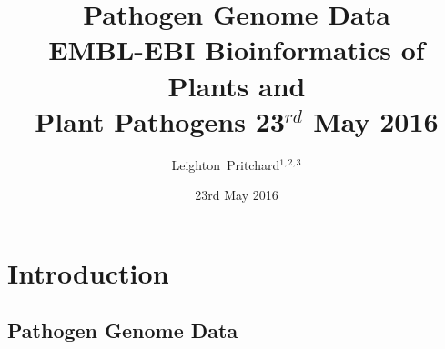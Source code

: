 

%



\title[Pathogen Genome Data] %
{Pathogen Genome Data \\
{\small EMBL-EBI Bioinformatics of Plants and \\ Plant Pathogens 23$^{rd}$ May 2016}}
\author[Leighton Pritchard] %
{Leighton~Pritchard$^{1,2,3}$}
\date[23rd May 2016] %
{23rd May 2016}
\subject{Bioinformatics, Genomics, Plant Pathogens, Plants, Microbiology, Microbes, Comparative Genomics, Visualisation}





\frame[plain]{\titlepage}



\section{Introduction}

\subsection{Pathogen Genome Data}


